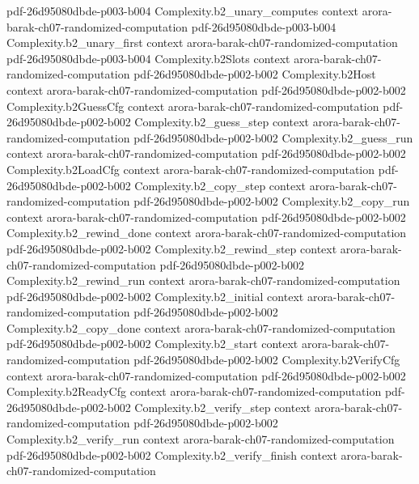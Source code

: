 \begin{theorem}
  {pdf-26d95080dbde-p003-b004}
\proofstep
  {Complexity.b2_unary_computes}
  {context}
  {arora-barak-ch07-randomized-computation}
  {pdf-26d95080dbde-p003-b004}
\proofstep
  {Complexity.b2_unary_first}
  {context}
  {arora-barak-ch07-randomized-computation}
  {pdf-26d95080dbde-p003-b004}
\proofstep
  {Complexity.b2Slots}
  {context}
  {arora-barak-ch07-randomized-computation}
  {pdf-26d95080dbde-p002-b002}
\proofstep
  {Complexity.b2Host}
  {context}
  {arora-barak-ch07-randomized-computation}
  {pdf-26d95080dbde-p002-b002}
\proofstep
  {Complexity.b2GuessCfg}
  {context}
  {arora-barak-ch07-randomized-computation}
  {pdf-26d95080dbde-p002-b002}
\proofstep
  {Complexity.b2_guess_step}
  {context}
  {arora-barak-ch07-randomized-computation}
  {pdf-26d95080dbde-p002-b002}
\proofstep
  {Complexity.b2_guess_run}
  {context}
  {arora-barak-ch07-randomized-computation}
  {pdf-26d95080dbde-p002-b002}
\proofstep
  {Complexity.b2LoadCfg}
  {context}
  {arora-barak-ch07-randomized-computation}
  {pdf-26d95080dbde-p002-b002}
\proofstep
  {Complexity.b2_copy_step}
  {context}
  {arora-barak-ch07-randomized-computation}
  {pdf-26d95080dbde-p002-b002}
\proofstep
  {Complexity.b2_copy_run}
  {context}
  {arora-barak-ch07-randomized-computation}
  {pdf-26d95080dbde-p002-b002}
\proofstep
  {Complexity.b2_rewind_done}
  {context}
  {arora-barak-ch07-randomized-computation}
  {pdf-26d95080dbde-p002-b002}
\proofstep
  {Complexity.b2_rewind_step}
  {context}
  {arora-barak-ch07-randomized-computation}
  {pdf-26d95080dbde-p002-b002}
\proofstep
  {Complexity.b2_rewind_run}
  {context}
  {arora-barak-ch07-randomized-computation}
  {pdf-26d95080dbde-p002-b002}
\proofstep
  {Complexity.b2_initial}
  {context}
  {arora-barak-ch07-randomized-computation}
  {pdf-26d95080dbde-p002-b002}
\proofstep
  {Complexity.b2_copy_done}
  {context}
  {arora-barak-ch07-randomized-computation}
  {pdf-26d95080dbde-p002-b002}
\proofstep
  {Complexity.b2_start}
  {context}
  {arora-barak-ch07-randomized-computation}
  {pdf-26d95080dbde-p002-b002}
\proofstep
  {Complexity.b2VerifyCfg}
  {context}
  {arora-barak-ch07-randomized-computation}
  {pdf-26d95080dbde-p002-b002}
\proofstep
  {Complexity.b2ReadyCfg}
  {context}
  {arora-barak-ch07-randomized-computation}
  {pdf-26d95080dbde-p002-b002}
\proofstep
  {Complexity.b2_verify_step}
  {context}
  {arora-barak-ch07-randomized-computation}
  {pdf-26d95080dbde-p002-b002}
\proofstep
  {Complexity.b2_verify_run}
  {context}
  {arora-barak-ch07-randomized-computation}
  {pdf-26d95080dbde-p002-b002}
\proofstep
  {Complexity.b2_verify_finish}
  {context}
  {arora-barak-ch07-randomized-computation}

\end{theorem}
